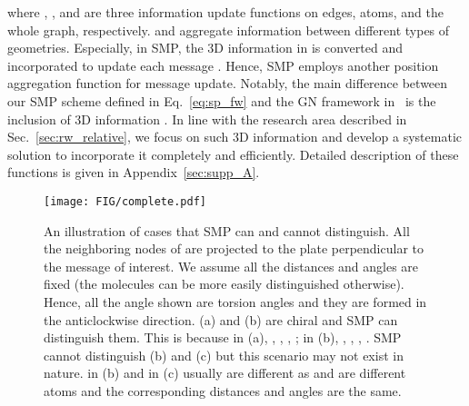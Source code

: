 \documentclass{article}
\begin{document}
where , , and  are three information update functions on edges, atoms, and the whole graph, respectively.
 and  aggregate information between different types of geometries.
Especially, in SMP, the 3D information in  is converted and incorporated to
update each message . Hence,
SMP employs another position 
aggregation function  for message update.
\textcolor{COLOR}{Notably, the main difference between our SMP scheme
defined in Eq.~\ref{eq:sp_fw} and the GN framework in~\cite{battaglia2018relational} is the inclusion of 3D information . In line with the research area described in Sec.~\ref{sec:rw_relative},
we focus on such 3D information and develop a systematic solution to incorporate it
completely and efficiently.}
Detailed description of these functions is given in Appendix~\ref{sec:supp_A}.

\begin{wrapfigure}[21]{r}{0.7\textwidth}\vspace{-0.4 cm}
    \texttt{[image: FIG/complete.pdf]}
    \caption{An illustration of cases that SMP can and cannot distinguish.
    All the neighboring nodes of  are projected to the plate perpendicular to
    the message of interest. We assume all the distances and angles are fixed (the molecules can be more 
    easily distinguished otherwise).
    Hence, all the angle shown are torsion angles and
    they are formed in the anticlockwise direction.
    (a) and (b) are chiral and SMP can distinguish them. This is because in (a),
    , , ,
    ; in (b),
    , , ,
    .
    SMP cannot distinguish (b) and (c) but this scenario may not exist in nature.
     in (b) and  in (c)
    usually are different as  and  are different atoms and the corresponding
    distances and angles are the same.
    }\label{fig:complete}
    \vspace{-10 pt}
\end{wrapfigure}
\end{document}
